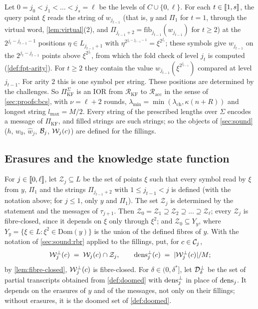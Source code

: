 Let $0 = j_0 < j_1 < \dots < j_s = \ell$ be the levels of $C \cup \{0, \ell\}$. For each $t \in \llbracket 1, s \rrbracket$, the query point $\xi$ reads the string of $w_{j_{t-1}}$ (that is, $y$ and $\Pi_1$ for $t = 1$, through the virtual word, \cref{lem:virtual}(2), and $\Pi_{j_{t-1}+2} = \mathrm{fib}_{j_{t-1}}(w_{j_{t-1}})$ for $t \ge 2$) at the $2^{j_t - j_{t-1} - 1}$ positions $\eta \in L_{j_{t-1}+1}$ with $\eta^{2^{j_t - j_{t-1} - 1}} = \xi^{2^{j_t}}$; these symbols give $w_{j_{t-1}}$ on the $2^{j_t - j_{t-1}}$ points above $\xi^{2^{j_t}}$, from which the fold check of level $j_t$ is computed (\cref{def:fpt-arity}). For $t \ge 2$ they contain the value $w_{j_{t-1}}(\xi^{2^{j_{t-1}}})$ compared at level $j_{t-1}$. For arity $2$ this is one symbol per string. These positions are determined by the challenges.
So $\Pi^\Sigma_{\mathrm{KF}}$ is an IOR from $\mathcal{R}_{\mathrm{KF}}$ to $\mathcal{R}_{\mathrm{acc}}$ in the sense of \cref{sec:proofs:bcs}, with $\nu = \ell+2$ rounds, $\lambda_{\min} = \min(\lambda_{\mathrm{ch}}, \kappa(n+R))$ and longest string $l_{\max} = M/2$.
Every string of the prescribed lengths over $\Sigma$ encodes a message of $\Pi_{\mathrm{KF}}$, and filled strings are such strings; so the objects of \cref{sec:sound} ($h$, $w_0$, $\hat w_j$, $\mathcal{B}_j$, $\mathcal{W}_j(c)$) are defined for the fillings.

\subsection{Erasures and the knowledge state function}\label{sec:pq:kstate}

For $j \in \llbracket 0, \ell \rrbracket$, let $\mathcal{Z}_j \subseteq L$ be the set of points $\xi$ such that every symbol read by $\xi$ from $y$, $\Pi_1$ and the strings $\Pi_{j_{t-1}+2}$ with $1 \le j_{t-1} < j$ is defined (with the notation above; for $j \le 1$, only $y$ and $\Pi_1$). The set $\mathcal{Z}_j$ is determined by the statement and the messages of $\tau_{j+1}$.
Then $\mathcal{Z}_0 = \mathcal{Z}_1 \supseteq \mathcal{Z}_2 \supseteq \dots \supseteq \mathcal{Z}_\ell$; every $\mathcal{Z}_j$ is fibre-closed, since it depends on $\xi$ only through $\xi^2$; and $\mathcal{Z}_0 \subseteq Y_y$, where $Y_y = \{\xi \in L : \xi^2 \in \mathrm{Dom}(y)\}$ is the union of the defined fibres of $y$.
With the notation of \cref{sec:sound:rbr} applied to the fillings, put, for $c \in \mathcal{C}_j$,
\[
  \mathcal{W}^\bot_j(c) \;=\; \mathcal{W}_j(c) \cap \mathcal{Z}_j, \qquad \mathrm{dens}^\bot_j(c) \;=\; |\mathcal{W}^\bot_j(c)|/M ;
\]
by \cref{lem:fibre-closed}, $\mathcal{W}^\bot_j(c)$ is fibre-closed.
For $\delta \in (0,\delta^*]$, let $\mathcal{D}^\bot_\delta$ be the set of partial transcripts obtained from \cref{def:doomed} with $\mathrm{dens}^\bot_j$ in place of $\mathrm{dens}_j$. It depends on the erasures of $y$ and of the messages, not only on their fillings; without erasures, it is the doomed set of \cref{def:doomed}.

